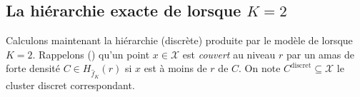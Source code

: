 \subsection{La hiérarchie exacte de  lorsque $K=2$}

Calculons maintenant la hiérarchie (discrète) produite par le modèle de  lorsque $K=2$.
Rappelons () qu'un point $x\in\mathcal X$ est \emph{couvert} au niveau $r$ par un amas de forte densité $ C \in H_{\widehat f_K}(r)$ si $x $ est à moins de $r$ de $C$. On note $C^{\mathrm{discret}} \subseteq \mathcal X$ le cluster discret correspondant.


\begin{figure}[htbp]
    \centering
    
    \begin{subfigure}[b]{0.45\textwidth}
        \centering
\end{subfigure}
\end{figure}

